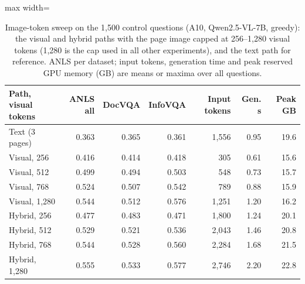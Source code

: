 \begin{table}[t]
\centering
\caption{Image-token sweep on the 1,500 control questions (A10, Qwen2.5-VL-7B, greedy): the visual and hybrid paths with the page image capped at 256--1,280 visual tokens (1,280 is the cap used in all other experiments), and the text path for reference. ANLS per dataset; input tokens, generation time and peak reserved GPU memory (GB) are means or maxima over all questions.}
\label{tab:token_sweep}
\begin{adjustbox}{max width=\linewidth}
\begin{tabular}{lrrrrrr}
\toprule
\textbf{Path, visual tokens} & \textbf{ANLS all} & \textbf{DocVQA} & \textbf{InfoVQA} & \textbf{Input tokens} & \textbf{Gen. s} & \textbf{Peak GB} \\
\midrule
Text (3 pages) & 0.363 & 0.365 & 0.361 & 1,556 & 0.95 & 19.6 \\
Visual, 256 & 0.416 & 0.414 & 0.418 & 305 & 0.61 & 15.6 \\
Visual, 512 & 0.499 & 0.494 & 0.503 & 548 & 0.73 & 15.7 \\
Visual, 768 & 0.524 & 0.507 & 0.542 & 789 & 0.88 & 15.9 \\
Visual, 1,280 & 0.544 & 0.512 & 0.576 & 1,251 & 1.20 & 16.2 \\
Hybrid, 256 & 0.477 & 0.483 & 0.471 & 1,800 & 1.24 & 20.1 \\
Hybrid, 512 & 0.529 & 0.521 & 0.536 & 2,043 & 1.46 & 20.8 \\
Hybrid, 768 & 0.544 & 0.528 & 0.560 & 2,284 & 1.68 & 21.5 \\
Hybrid, 1,280 & 0.555 & 0.533 & 0.577 & 2,746 & 2.20 & 22.8 \\
\bottomrule
\end{tabular}
\end{adjustbox}
\end{table}
